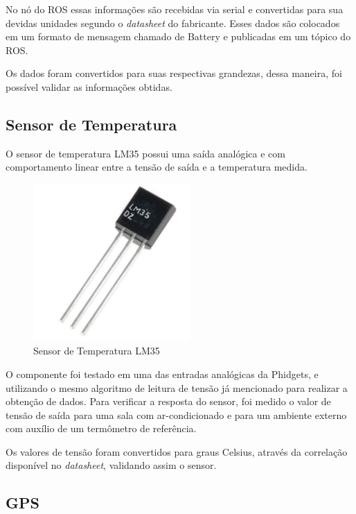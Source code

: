       No nó do ROS essas informações são recebidas via serial e convertidas para sua devidas unidades segundo o \textit{datasheet} do fabricante. Esses dados são colocados em um formato de mensagem chamado de Battery e publicadas em um tópico do ROS.
	    
	    Os dados foram convertidos para suas respectivas grandezas, dessa maneira, foi possível validar as informações obtidas.
    
    \subsection{Sensor de Temperatura}
    
	    O sensor de temperatura LM35 possui uma saída analógica e com comportamento linear entre a tensão de saída e a temperatura medida.
	    
	    \begin{figure}[!ht]
			   \centering
			   \includegraphics[width=6cm]{Figures/lm35.jpg}
			   \caption{Sensor de Temperatura LM35}
			   \label{fig:LM35}
		\end{figure}
	   
	    O componente foi testado em uma das entradas analógicas da Phidgets, e utilizando o mesmo algoritmo de leitura de tensão já mencionado para realizar a obtenção de dados. Para verificar a resposta do sensor, foi medido o valor de tensão de saída para uma sala com ar-condicionado e para um ambiente externo com auxílio de um termômetro de referência.
	    
	    Os valores de tensão foram convertidos para graus Celsius, através da correlação disponível no \textit{datasheet}, validando assim o sensor.
    
    \subsection{GPS}
    
